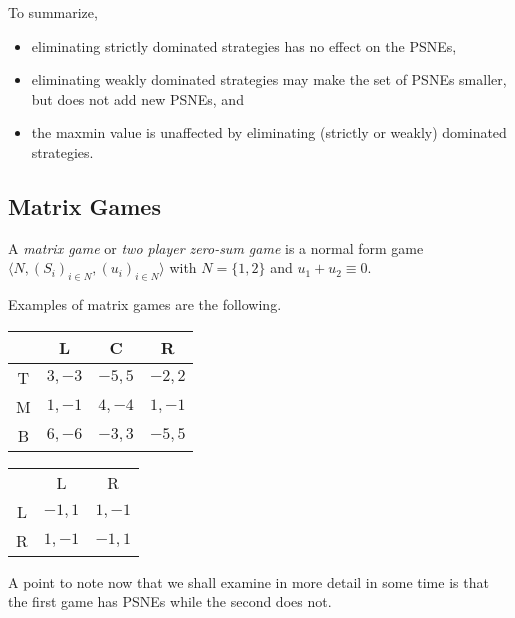 	To summarize,
	\begin{itemize}
		\item eliminating strictly dominated strategies has no effect on the PSNEs,
		\item eliminating weakly dominated strategies may make the set of PSNEs smaller, but does not add new PSNEs, and
		\item the maxmin value is unaffected by eliminating (strictly or weakly) dominated strategies.
	\end{itemize}

\subsection{Matrix Games}

	\begin{fdef}
		A \emph{matrix game} or \emph{two player zero-sum game} is a normal form game $\langle N , (S_i)_{i \in N} , (u_i)_{i \in N} \rangle$ with $N = \{1,2\}$ and $u_1 + u_2 \equiv 0$.
	\end{fdef}

	\begin{fex}
		\label{ex: matrix game}
		Examples of matrix games are the following.

		\begin{center}
		\begin{tabular}{|c||c|c|c|}
			\hline
			& \textsf{L} & \textsf{C} & \textsf{R} \\ \hline \hline
			\textsf{T} & $3,-3$ & $-5,5$ & $-2,2$ \\ \hline
			\textsf{M} & $1,-1$ & $4,-4$ & $1,-1$ \\ \hline
			\textsf{B} & $6,-6$ & $-3,3$ & $-5,5$ \\ \hline
		\end{tabular}
		\end{center}

		\begin{center}
		\begin{tabular}{|c||c|c|}
			\hline
			& \textsf{L} & \textsf{R} \\
			\textsf{L} & $-1,1$ & $1,-1$ \\
			\textsf{R} & $1,-1$ & $-1,1$
		\end{tabular}
		\end{center}

		A point to note now that we shall examine in more detail in some time is that the first game has PSNEs while the second does not.
	\end{fex}

